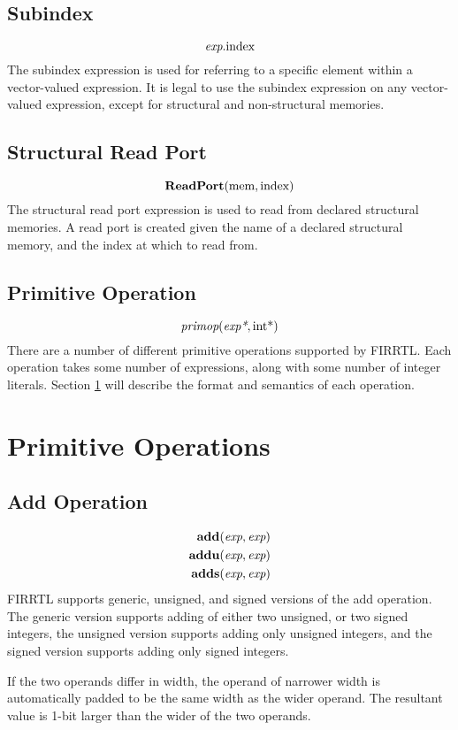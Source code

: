 \documentclass[12pt]{article}
\begin{document}
\subsection{Subindex}
\[
\text{\em exp}.\text{index}
\]
The subindex expression is used for referring to a specific element within a vector-valued expression. It is legal to use the subindex expression on any vector-valued expression, except for structural and non-structural memories. 

\subsection{Structural Read Port}
\[
\text{\bf ReadPort}(\text{mem}, \text{index})
\]
The structural read port expression is used to read from declared structural memories. A read port is created given the name of a declared structural memory, and the index at which to read from. 


\subsection{Primitive Operation}
\[
\text{\em primop}(\text{\em exp*}, \text{int}\text{*})
\]
There are a number of different primitive operations supported by FIRRTL. Each operation takes some number of expressions, along with some number of integer literals. Section \ref{primitives} will describe the format and semantics of each operation.


\section{Primitive Operations} \label{primitives}
\subsection{Add Operation}
\[
\begin{aligned}
\text{\bf add}(\text{\em exp}, \text{\em exp})      \\
\text{\bf addu}(\text{\em exp}, \text{\em exp})     \\
\text{\bf adds}(\text{\em exp}, \text{\em exp})     \\
\end{aligned}
\]
FIRRTL supports generic, unsigned, and signed versions of the add operation. The generic version supports adding of either two unsigned, or two signed integers, the unsigned version supports adding only unsigned integers, and the signed version supports adding only signed integers. 

If the two operands differ in width, the operand of narrower width is automatically padded to be the same width as the wider operand. The resultant value is 1-bit larger than the wider of the two operands.
\end{document}
